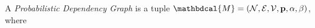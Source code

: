\documentclass[letterpaper]{article} %
\theoremstyle{plain}
\theoremstyle{definition}
\theoremstyle{remark}
\DeclareMathOperator*{\Ex}{\mathbb{E}} %
\newcommand\mat[1]{\mathbf{#1}}
\newcommand{\V}{\mathcal V}
\newcommand{\N}{\mathcal N}
\newcommand{\Ed}{\mathcal E}
\newcommand{\pdgvars}[1][]{(\N#1, \Ed#1, \V#1, \mat p#1, \beta#1)}
\newcommand{\dg}[1]{\mathbdcal{#1}}
\newcommand{\Gr}{\mathcal G}
\begin{document}
\begin{defn}\label{def:model}
A \emph{Probabilistic Dependency Graph}
is a tuple $\dg M = (\N,\Ed,\V,\mat p, \alpha, \beta)$, where 


\end{defn}
\end{document}

